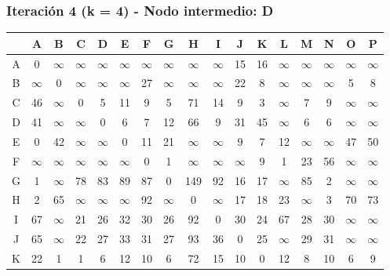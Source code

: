 \documentclass[12pt]{article}
\begin{document}
\subsubsection{Iteración 4 (k = 4) - Nodo intermedio: D}
\begin{table}[h!]
\centering
\begin{tabular}{|c|c|c|c|c|c|c|c|c|c|c|c|c|c|c|c|c|}
\hline
 & A & B & C & D & E & F & G & H & I & J & K & L & M & N & O & P \\\hline
A & 0 & $\infty$ & $\infty$ & $\infty$ & $\infty$ & $\infty$ & $\infty$ & $\infty$ & $\infty$ & 15 & 16 & $\infty$ & $\infty$ & $\infty$ & $\infty$ & $\infty$ \\\hline
B & $\infty$ & 0 & $\infty$ & $\infty$ & $\infty$ & 27 & $\infty$ & $\infty$ & $\infty$ & 22 & 8 & $\infty$ & $\infty$ & $\infty$ & 5 & 8 \\\hline
C & \cellcolor{lightgreen} 46 & $\infty$ & 0 & 5 & \cellcolor{lightgreen} 11 & 9 & 5 & \cellcolor{lightgreen} 71 & \cellcolor{lightgreen} 14 & 9 & 3 & $\infty$ & 7 & 9 & $\infty$ & $\infty$ \\\hline
D & 41 & $\infty$ & $\infty$ & 0 & 6 & 7 & 12 & 66 & 9 & 31 & 45 & $\infty$ & 6 & 6 & $\infty$ & $\infty$ \\\hline
E & 0 & 42 & $\infty$ & $\infty$ & 0 & 11 & 21 & $\infty$ & $\infty$ & 9 & 7 & 12 & $\infty$ & $\infty$ & 47 & 50 \\\hline
F & $\infty$ & $\infty$ & $\infty$ & $\infty$ & $\infty$ & 0 & 1 & $\infty$ & $\infty$ & $\infty$ & 9 & 1 & 23 & 56 & $\infty$ & $\infty$ \\\hline
G & 1 & $\infty$ & 78 & 83 & \cellcolor{lightgreen} 89 & 87 & 0 & \cellcolor{lightgreen} 149 & \cellcolor{lightgreen} 92 & 16 & 17 & $\infty$ & 85 & 2 & $\infty$ & $\infty$ \\\hline
H & 2 & 65 & $\infty$ & $\infty$ & $\infty$ & 92 & $\infty$ & 0 & $\infty$ & 17 & 18 & 23 & $\infty$ & 3 & 70 & 73 \\\hline
I & \cellcolor{lightgreen} 67 & $\infty$ & 21 & 26 & \cellcolor{lightgreen} 32 & 30 & 26 & \cellcolor{lightgreen} 92 & 0 & 30 & 24 & 67 & 28 & 30 & $\infty$ & $\infty$ \\\hline
J & 65 & $\infty$ & 22 & 27 & \cellcolor{lightgreen} 33 & 31 & 27 & \cellcolor{lightgreen} 93 & \cellcolor{lightgreen} 36 & 0 & 25 & $\infty$ & 29 & 31 & $\infty$ & $\infty$ \\\hline
K & 22 & 1 & 1 & 6 & \cellcolor{lightgreen} 12 & 10 & 6 & \cellcolor{lightgreen} 72 & \cellcolor{lightgreen} 15 & 10 & 0 & 12 & 8 & 10 & 6 & 9 \\\hline

\end{tabular}
\end{table}
\end{document}
